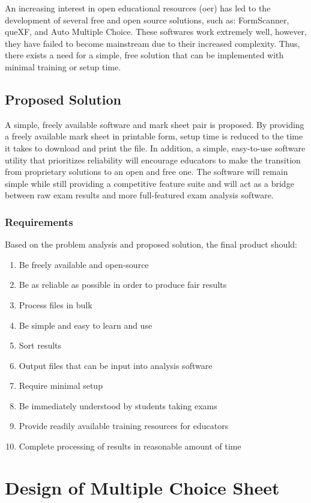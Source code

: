\documentclass[12pt, letterpaper]{report}
\begin{document}
An increasing interest in open educational resources (\ac{oer}) has led to the
development of several free and open source solutions, such as: FormScanner,
queXF, and Auto Multiple Choice. These softwares work extremely well, however,
they have failed to become mainstream due to their increased complexity. Thus,
there exists a need for a simple, free solution that can be implemented with
minimal training or setup time.
\section{Proposed Solution}
A simple, freely available software and mark sheet pair is proposed. By
providing a freely available mark sheet in printable form, setup time is reduced
to the time it takes to download and print the file. In addition, a simple,
easy-to-use software utility that prioritizes reliability will encourage
educators to make the transition from proprietary solutions to an open and free
one. The software will remain simple while still providing a competitive feature
suite and will act as a bridge between raw exam results and more full-featured
exam analysis software.
\subsection{Requirements}
Based on the problem analysis and proposed solution, the final product should:

\begin{enumerate}
  \item Be freely available and open-source
  \item Be as reliable as possible in order to produce fair results
  \item Process files in bulk
  \item Be simple and easy to learn and use
  \item Sort results
  \item Output files that can be input into analysis software
  \item Require minimal setup
  \item Be immediately understood by students taking exams
  \item Provide readily available training resources for educators
  \item Complete processing of results in reasonable amount of time
\end{enumerate}

\chapter{Design of Multiple Choice Sheet}
\end{document}
